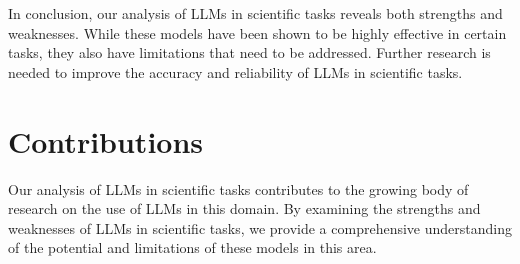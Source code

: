 \documentclass[11pt]{article}
\begin{document}
In conclusion, our analysis of LLMs in scientific tasks reveals both strengths and weaknesses. While these models have been shown to be highly effective in certain tasks, they also have limitations that need to be addressed. Further research is needed to improve the accuracy and reliability of LLMs in scientific tasks.

\section{Contributions}

Our analysis of LLMs in scientific tasks contributes to the growing body of research on the use of LLMs in this domain. By examining the strengths and weaknesses of LLMs in scientific tasks, we provide a comprehensive understanding of the potential and limitations of these models in this area.
\end{document}
